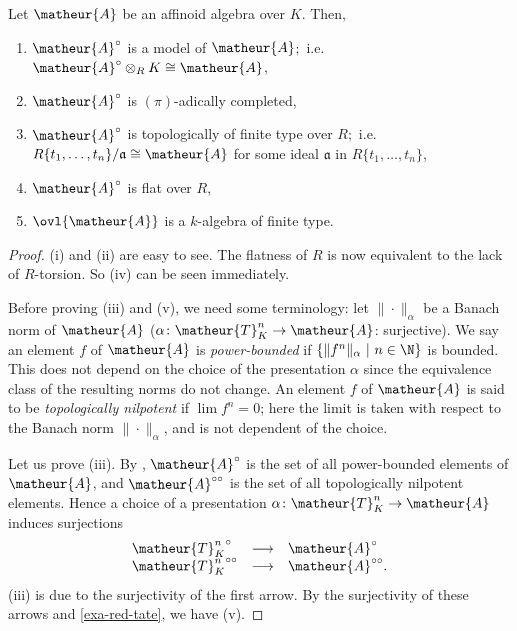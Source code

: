 \begin{apppro}
Let $\matheur{A}$ be an affinoid algebra over $K$. Then,
\begin{enumerate}
 \item $\matheur{A}^{\circ}$ is a model of $\matheur{A}$$;$
       i.e.\ $\matheur{A}^{\circ}\otimes_RK\cong\matheur{A}$,
 \item $\matheur{A}^{\circ}$ is $(\pi)$-adically completed, 
 \item $\matheur{A}^{\circ}$ is topologically of finite
       type over $R$$;$ i.e.\
       $R\{t_1,\ldots,t_n\}/\mathfrak{a}\cong\matheur{A}$ 
       for some ideal $\mathfrak{a}$ in $R\{t_1,\ldots,t_n\}$,
 \item $\matheur{A}^{\circ}$ is flat over $R$,
 \item $\ovl{\matheur{A}}$ is a $k$-algebra of finite type.
\end{enumerate}
\end{apppro}

\begin{proof}
(i) and (ii) are easy to see.
The flatness of $R$ is now equivalent to the lack of $R$-torsion.
So (iv) can be seen immediately.

Before proving (iii) and (v), we need some terminology:
let $\|\cdot\|_{\alpha}$ be a Banach norm of $\matheur{A}$ ($\alpha\colon
\matheur{T}^n_K\rightarrow\matheur{A}$: surjective).
We say an element $f$ of $\matheur{A}$ is {\it power-bounded} if 
$\{\|f^n\|_{\alpha}\ |\ n\in\N\}$ is bounded.
This does not depend on the choice of the presentation $\alpha$ since
the equivalence class of the resulting norms do not change.
An element $f$ of $\matheur{A}$ is said to be {\it topologically nilpotent}
if $\lim f^n=0$; here the limit is taken with respect to the Banach
norm $\|\cdot\|_{\alpha}$, and is not dependent of the choice.

Let us prove (iii).
By \cite[6.2.3]{na}, $\matheur{A}^{\circ}$ is the set of all power-bounded
elements of $\matheur{A}$, and $\matheur{A}^{\circ\circ}$ is the set of all
topologically nilpotent elements.
Hence a choice of a presentation 
$\alpha\colon\matheur{T}^n_K\rightarrow\matheur{A}$ induces surjections
$$
\begin{array}{lcl}
{\matheur{T}^n_K}^{\circ}&\longrightarrow&\matheur{A}^{\circ}\\
{\matheur{T}^n_K}^{\circ\circ}&\longrightarrow&\matheur{A}^{\circ\circ}.
\end{array}
$$
(iii) is due to the surjectivity of the first arrow.
By the surjectivity of these arrows and \ref{exa-red-tate}, we have
(v).
\end{proof}

